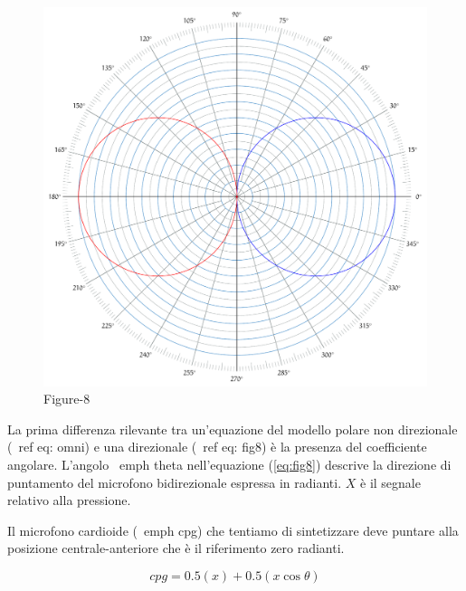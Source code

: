 \begin{figure}[h]
\centering
\includegraphics[width=1\columnwidth]{CAPITOLI/_TIKZ/POLAR/fig8}
\caption{Figure-8}
\label{fig:mspan}
\end{figure}

La prima differenza rilevante tra un'equazione del modello polare non
direzionale (\ ref {eq: omni}) e una direzionale (\ ref {eq: fig8}) è la
presenza del coefficiente angolare. L'angolo \ emph {theta} nell'equazione
(\ref{eq:fig8}) descrive la direzione di puntamento del microfono bidirezionale
espressa in radianti. $ X $ è il segnale relativo alla pressione.

Il microfono cardioide (\ emph {cpg}) che tentiamo di sintetizzare deve puntare
alla posizione centrale-anteriore che è il riferimento zero radianti.

\begin{equation}
cpg = 0.5(x) + 0.5(x\cos\theta)
\label{eq:cardioid}
\end{equation}


